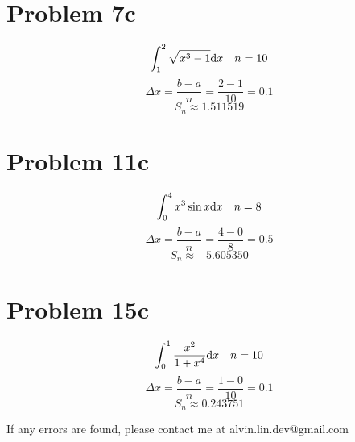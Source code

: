 \documentclass[letterpaper, 12pt]{math}
\begin{document}
\section*{Problem 7c}
\[ \int_{1}^{2}{\sqrt{x^{3}-1}\mathrm{d}{x}} \quad n = 10 \]
\[ \Delta x = \frac{b-a}{n} = \frac{2-1}{10} = 0.1 \]
\[ S_{n} \approx 1.511519 \]

\section*{Problem 11c}
\[ \int_{0}^{4}{x^{3}\sin{x}\mathrm{d}{x}} \quad n = 8 \]
\[ \Delta x = \frac{b-a}{n} = \frac{4-0}{8} = 0.5 \]
\[ S_{n} \approx -5.605350 \]

\section*{Problem 15c}
\[ \int_{0}^{1}{\frac{x^{2}}{1+x^{4}}\mathrm{d}{x}} \quad n = 10 \]
\[ \Delta x = \frac{b-a}{n} = \frac{1-0}{10} = 0.1 \]
\[ S_{n} \approx 0.243751 \]

\begin{center}
  If any errors are found, please contact me at alvin.lin.dev@gmail.com
\end{center}
\end{document}
